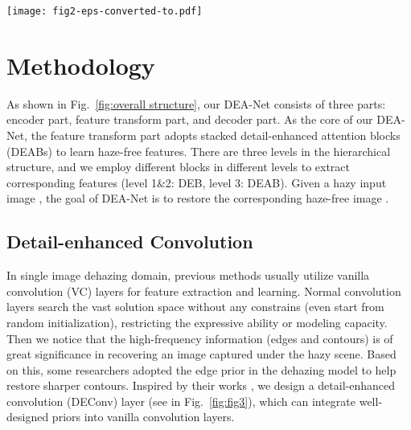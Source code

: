 \documentclass[lettersize,journal]{IEEEtran}
\begin{document}
\begin{figure*}[!t]
	\centering
	\texttt{[image: fig2-eps-converted-to.pdf]}
	\caption{The overall architecture of our proposed detail-enhanced attention network (DEA-Net), which is a three-level encoder-decoder-like architecture. DEA-Net contains three parts: encoder part, feature transform part, and decoder part. We deploy detail-enhanced attention blocks (DEABs) in the feature transform part, and deploy detail-enhanced blocks (DEBs) in rest parts.}
	\label{fig:overall structure}
\end{figure*}










\section{Methodology}
\label{sec: methodology}
As shown in Fig.~\ref{fig:overall structure}, our DEA-Net consists of three parts: encoder part, feature transform part, and decoder part.
As the core of our DEA-Net, the feature transform part adopts stacked detail-enhanced attention blocks (DEABs) to learn haze-free features.
There are three levels in the hierarchical structure, and we employ different blocks in different levels to extract corresponding features (level 1\&2: DEB, level 3: DEAB).
Given a hazy input image , the goal of DEA-Net is to restore the corresponding haze-free image . 

\subsection{Detail-enhanced Convolution}
In single image dehazing domain, previous methods \cite{qin2020AAAI,Wu2020CVPRW,wu2021CVPR} usually utilize vanilla convolution (VC) layers for feature extraction and learning.
Normal convolution layers search the vast solution space without any constrains (even start from random initialization), restricting the expressive ability or modeling capacity.
Then we notice that the high-frequency information (\eg edges and contours) is of great significance in recovering an image captured under the hazy scene.
Based on this, some researchers \cite{zhang2018CVPR,bai2022TIP,wang2021KBS} adopted the edge prior in the dehazing model to help restore sharper contours. 
Inspired by their works \cite{zhang2018CVPR,wang2021KBS}, we design a detail-enhanced convolution (DEConv) layer (see in Fig.~\ref{fig:fig3}), which can integrate well-designed priors into vanilla convolution layers.
\end{document}
